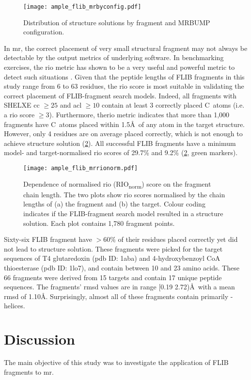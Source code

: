\begin{figure}[H]
	\centering
	\texttt{[image: ample\_flib\_mrbyconfig.pdf]}
	\caption[MR structure solutions by input parameters]{Distribution of structure solutions by fragment and MRBUMP configuration.}
	\label{fig:ample_flib_mrbyconfig}
\end{figure}

In \gls{mr}, the correct placement of very small structural fragment may not always be detectable by the output metrics of underlying software. In benchmarking exercises, the \gls{rio} metric has shown to be a very useful and powerful metric to detect such situations \cite{Thomas2015-ag,Simkovic2016-jx,Thomas2017-lq}. Given that the peptide lengths of FLIB fragments in this study range from 6 to 63 residues, the \gls{rio} score is most suitable in validating the correct placement of FLIB-fragment search models. Indeed, all fragments with SHELXE \gls{cc} $\geq25$ and \gls{acl} $\geq10$ contain at least 3 correctly placed C\textalpha\ atoms (i.e. a \gls{rio} score $\geq3$). Furthermore, the\gls{rio} metric indicates that more than 1,000 fragments have C\textalpha\ atoms placed within 1.5\AA\ of any atom in the target structure. However, only 4 residues are on average placed correctly, which is not enough to achieve structure solution (\cref{fig:ample_flib_mrrionorm}). All successful FLIB fragments have a minimum model- and target-normalised \gls{rio} scores of 29.7\% and 9.2\% (\cref{fig:ample_flib_mrrionorm}, green markers). 

\begin{figure}[H]
	\centering
	\texttt{[image: ample\_flib\_mrrionorm.pdf]}
	\caption[Relationship between fragment chain length and normalised RIO scores.]{Dependence of normalised \acrlong{rio} (RIO\textsubscript{norm}) score on the fragment chain length. The two plots show  \gls{rio} scores normalised by the chain lengths of (a) the fragment and (b) the target. Colour coding indicates if the FLIB-fragment search model resulted in a structure solution. Each plot contains 1,780 fragment points.}
	\label{fig:ample_flib_mrrionorm}
\end{figure}

Sixty-six FLIB fragment have $>60$\% of their residues placed correctly yet did not lead to structure solution. These fragments were picked for the target sequences of T4 glutaredoxin (\gls{pdb} ID: 1aba) and 
4-hydroxybenzoyl CoA thioesterase (\gls{pdb} ID: 1lo7), and contain between 10 and 23 amino acids. These 66 fragments were derived from 15 targets and contain 17 unique peptide sequences. The fragments' \gls{rmsd} values are in range [0.19 2.72)\AA\ with a mean \gls{rmsd} of 1.10\AA. Surprisingly, almost all of these fragments contain primarily \textalpha-helices.


\section{Discussion}
The main objective of this study was to investigate the application of FLIB fragments to \gls{mr}.
